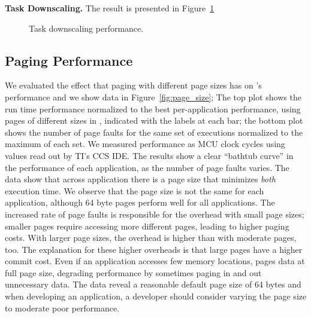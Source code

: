 \textbf{Task Downscaling.} The result is presented in Figure~\ref{fig:task_downscaling} 

\begin{figure}
	\centering
	\caption{Task downscaling performance. }
	\label{fig:task_downscaling}
\end{figure}	

\subsection{\sys Paging Performance}
\label{sec:results_memory_management}

We evaluated the effect that paging with different page sizes has on \sys's performance and we show data in Figure~\ref{fig:page_size}; The top plot shows the run time performance normalized to the best per-application performance, using pages of different sizes in \sys, indicated with the labels at each bar; the bottom plot shows the number of page faults for the same set of executions normalized to the maximum of each set. We measured performance as MCU clock cycles using values read out by TI's CCS IDE. The results show a clear ``bathtub curve'' in the performance of each application, as the number of page faults varies. The data show that across application there is a page size that minimizes \emph{both} execution time. We observe that the page size is not the same for each application, although 64 byte pages perform well for all applications. The increased rate of page faults is responsible for the overhead with small page sizes; smaller pages require accessing more different pages, leading to higher paging costs. With larger page sizes, the overhead is higher than with moderate pages, too. The explanation for these higher overheads is that large pages have a higher commit cost. Even if an application accesses few memory locations, \sys pages data at full page size, degrading performance by sometimes paging in and out unnecessary data. The data reveal a reasonable default page size of 64 bytes and when developing an application, a developer should consider varying the page size to moderate poor performance.

